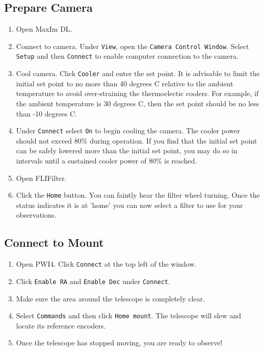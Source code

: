 \documentclass{article}
\begin{document}
		\subsection{Prepare Camera}
		
			\begin{enumerate}
				
				\item Open MaxIm DL.
							
				\item Connect to camera. Under \texttt{View}, open the \texttt{Camera Control Window}. Select \texttt{Setup} and then \texttt{Connect} to enable computer connection to the camera.
				
				\item Cool camera. Click \texttt{Cooler} and enter the set point. It is advisable to limit the initial set point to no more than 40 degrees C relative to the ambient temperature to avoid over-straining the thermoelectic coolers. For example, if the ambient temperature is 30 degrees C, then the set point should be no less than -10 degrees C.
				
				\item Under \texttt{Connect} select \texttt{On} to begin cooling the camera. The cooler power should not exceed 80\% during operation. If you find that the initial set point can be safely lowered more than the initial set point, you may do so in intervals until a sustained cooler power of 80\% is reached.
				
				\item Open FLIFilter.
				
				\item Click the \texttt{Home} button. You can faintly hear the filter wheel turning. Once the status indicates it is at 'home' you can now select a filter to use for your observations.
				
			\end{enumerate}
		
		\subsection{Connect to Mount}
		
			\begin{enumerate}
								
				\item Open PWI4. Click \texttt{Connect} at the top left of the window.
				
				\item Click \texttt{Enable RA} and \texttt{Enable Dec} under \texttt{Connect}.
	
				\item Make sure the area around the telescope is completely clear.
	
				\item Select \texttt{Commands} and then click \texttt{Home mount}. The telescope will slew and locate its reference encoders.
				
				\item Once the telescope has stopped moving, you are ready to observe!
							
			\end{enumerate}
		
\end{document}
